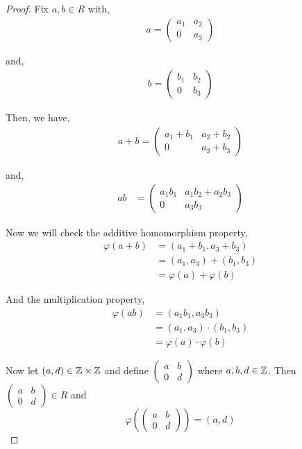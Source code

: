 \documentclass[11pt, reqno]{amsart}
\theoremstyle{plain}
\theoremstyle{definition}
\theoremstyle{example}
\begin{document}
\begin{enumerate}[1.]
\begin{enumerate}[(a)]
\begin{proof}
Fix $a, b \in R$ with,
\begin{align*}
a = \begin{pmatrix} a_1 & a_2 \\ 0 & a_3 \end{pmatrix}
\end{align*}

and,
\begin{align*}
b = \begin{pmatrix} b_1 & b_2 \\ 0 & b_3 \end{pmatrix}
\end{align*}

Then, we have,
\begin{align*}
a + b = \begin{pmatrix} a_1 + b_1 & a_2 + b_2\\ 0 & a_3 + b_3 \end{pmatrix}
\end{align*}

and,
\begin{align*}
ab &= \begin{pmatrix} a_1b_1 & a_1b_2 + a_2b_3 \\ 0 & a_3b_3 \end{pmatrix}
\end{align*}

Now we will check the additive homomorphism property,
\begin{align*}
\varphi(a + b) &= (a_1 + b_1, a_3 + b_3)\\
&= (a_1, a_3) + (b_1, b_3)\\
&= \varphi(a) + \varphi(b)
\end{align*}

And the multiplication property,
\begin{align*}
\varphi(ab) &= (a_1b_1, a_3b_3)\\
&= (a_1, a_3) \cdot (b_1, b_3)\\
&= \varphi(a) \cdot \varphi(b)
\end{align*}

Now let $(a, d) \in \mathbb{Z} \times \mathbb{Z}$ and define $\begin{pmatrix} a & b \\ 0 & d \end{pmatrix}$ where $a, b, d \in \mathbb{Z}$. Then $\begin{pmatrix} a & b \\ 0 & d \end{pmatrix} \in R$ and $$\varphi\left(\begin{pmatrix} a & b \\ 0 & d \end{pmatrix}\right) = (a, d)$$


\end{proof}
\end{enumerate}
\end{enumerate}
\end{document}
